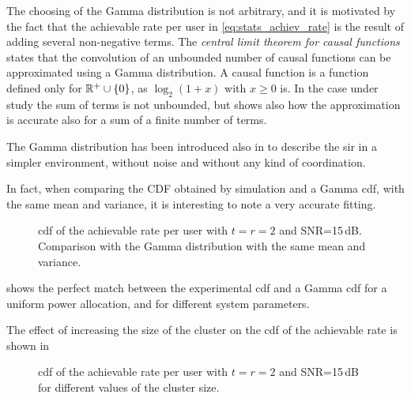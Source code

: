 The choosing of the Gamma distribution is not arbitrary, and it is motivated by
the fact that the achievable rate per user in \eqref{eq:stats_achiev_rate} is
the result of adding several non-negative terms. The \emph{central limit theorem
for causal functions} \cite{papoulis_fourier} states that the convolution of an
unbounded number of causal functions can be approximated using a Gamma
distribution. A causal function is a function defined only for $\mathbb{R}^{+}
\cup \left\{0\right\}$, as $\log_2\left(1+x\right)$ with $x \geq 0$ is. In the
case under study the sum of terms is not unbounded, but \cite{papoulis_fourier}
shows also how the approximation is accurate also for a sum of a finite number
of terms.

The Gamma distribution has been introduced also in \cite{cheikh11} to describe
the \gls{sir} in a simpler environment, without noise and without any kind of
coordination.

In fact, when comparing the CDF obtained by simulation and a Gamma \gls{cdf},
with the same mean and variance, it is interesting to note a very accurate
fitting.

\begin{figure}[t]
\begin{center}
    \hspace*{8mm}
\end{center}
\caption{\gls{cdf} of the achievable rate per user with $t=r=2$ and
SNR=15\,dB. Comparison with the Gamma distribution with the same mean and
variance.}
\label{fig:cdf_sim_analy}
\end{figure}

 shows the perfect match between the experimental
\gls{cdf} and a Gamma \gls{cdf} for a uniform power allocation, and for
different system parameters.

The effect of increasing the size of the cluster on the \gls{cdf} of the
achievable rate is shown in 

\begin{figure}[t]
\begin{center}
    \hspace*{1mm}
\end{center}
\caption{\gls{cdf} of the achievable rate per user with $t=r=2$ and
SNR=15\,dB for different values of the cluster size.}
\label{fig:cdf_cluster_size}
\end{figure}


